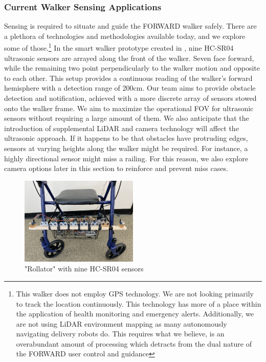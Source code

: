 \subsubsection{Current Walker Sensing Applications}
\noindent Sensing is required to situate and guide the FORWARD walker safely. There are a plethora of technologies and methodologies available today, and we explore some of those.\footnote{\noindent This walker does not employ GPS technology. We are not looking primarily to track the location continuously. This technology has more of a place within the application of health monitoring and emergency alerts. Additionally, we are not using LiDAR environment mapping as many autonomously navigating delivery robots do. This requires what we believe, is an overabundant amount of processing which detracts from the dual nature of the FORWARD user control and guidance} In the smart walker prototype created in \cite{Mostofa}, nine HC-SR04 ultrasonic sensors are arrayed along the front of the walker. Seven face forward, while the remaining two point perpendicularly to the walker motion and opposite to each other. This setup provides a continuous reading of the walker's forward hemisphere with a detection range of 200cm. Our team aims to provide obstacle detection and notification, achieved with a more discrete array of sensors stowed onto the walker frame. We aim to maximize the operational FOV for ultrasonic sensors without requiring a large amount of them. We also anticipate that the introduction of supplemental LiDAR and camera technology will affect the ultrasonic approach. If it happens to be that obstacles have protruding edges, sensors at varying heights along the walker might be required. For instance, a highly directional sensor might miss a railing. For this reason, we also explore camera options later in this section to reinforce and prevent miss cases.\\

\begin{figure}[H]
	\centering
	\includegraphics[width=0.5\textwidth]{./Images/mostafa9.png}
	\caption{\label{fig:mostafa9}"Rollator" with nine HC-SR04 sensors \cite{Mostofa}}
\end{figure}

